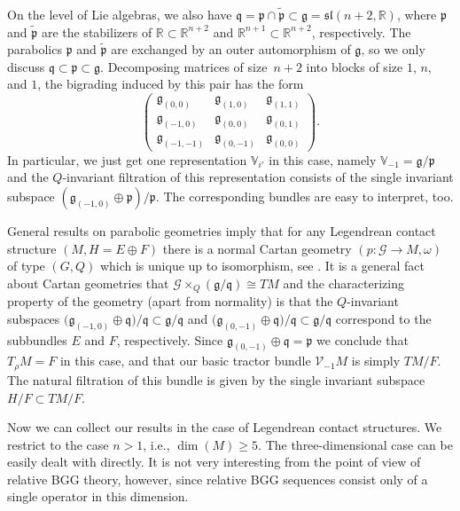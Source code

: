 \documentclass[pdftex]{sigma}
\numberwithin{equation}{section}
\def\frak{\mathfrak}
\def\Bbb{\mathbb}
\def\Cal{\mathcal}
\newcommand{\x}{\times}
\newcommand{\om}{\omega}
\begin{document}
On the level of Lie algebras, we also have
$\frak q=\frak p\cap\tilde{\frak p}\subset\frak g=\frak{sl}(n+2,\Bbb R)$, where
$\frak p$ and $\tilde{\frak p}$ are the stabilizers of $\Bbb R\subset\Bbb R^{n+2}$
and $\Bbb R^{n+1}\subset\Bbb R^{n+2}$, respectively. The parabolics $\frak p$ and
$\tilde{\frak p}$ are exchanged by an outer automorphism of $\frak g$, so we only
discuss $\frak q\subset\frak p\subset\frak g$. Decomposing matrices of size~${n+2}$
into blocks of size $1$, $n$, and $1$, the bigrading induced by this pair has the
form
\begin{equation}\label{bigrading}
\begin{pmatrix} \frak g_{(0,0)} & \frak g_{(1,0)} & \frak g_{(1,1)} \\
 \frak g_{(-1,0)} & \frak g_{(0,0)} & \frak g_{(0,1)} \\
 \frak g_{(-1,-1)} & \frak g_{(0,-1)} & \frak g_{(0,0)}
\end{pmatrix}.
\end{equation}
In particular, we just get one representation $\Bbb V_{i'}$ in this case, namely $\Bbb
V_{-1}=\frak g/\frak p$ and the $Q$-invariant filtration of this representation
consists of the single invariant subspace $(\frak g_{(-1,0)}\oplus\frak p)/\frak
p$. The corresponding bundles are easy to interpret, too.

General results on parabolic geometries imply that for any Legendrean contact
structure $(M,H=E\oplus F)$ there is a normal Cartan geometry $(p\colon \Cal G\to M,\om)$
of type $(G,Q)$ which is unique up to isomorphism, see \cite[Section 4.2.3]{book}.
It is a general fact about Cartan geometries that $\Cal G\x_Q(\frak
g/\frak q)\cong TM$ and the characterizing property of the geometry (apart from
normality) is that the $Q$-invariant subspaces $\bigl(\frak g_{(-1,0)}\oplus \frak
q\bigr)/\frak q\subset\frak g/\frak q$ and $\bigl(\frak g_{(0,-1)}\oplus \frak q\bigr)/\frak
q\subset\frak g/\frak q$ correspond to the subbundles $E$ and $F$,
respectively. Since $\frak g_{(0,-1)}\oplus \frak q=\frak p$ we conclude that
$T_{\rho}M=F$ in this case, and that our basic tractor bundle $\Cal V_{-1}M$ is
simply $TM/F$. The natural filtration of this bundle is given by the single invariant
subspace $H/F\subset TM/F$.

Now we can collect our results in the case of Legendrean contact structures. We
restrict to the case $n>1$, i.e., $\dim(M)\geq 5$. The three-dimensional case can be
easily dealt with directly. It is not very interesting from the point of view of
relative BGG theory, however, since relative BGG sequences consist only of a single
operator in this dimension.
\end{document}
